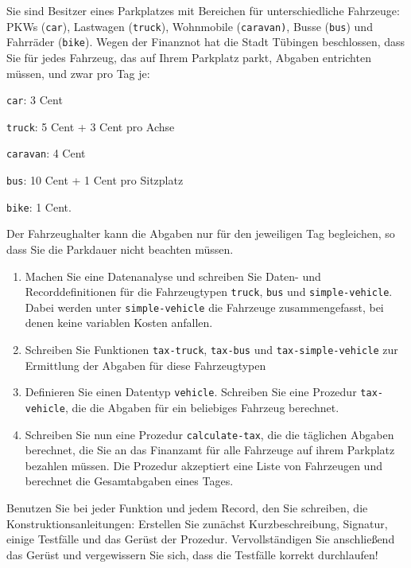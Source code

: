 \begin{aufgabe}
   Sie sind Besitzer eines Parkplatzes mit
  Bereichen für unterschiedliche Fahrzeuge:  PKWs (\texttt{car}), Lastwagen
  (\texttt{truck}), Wohnmobile (\texttt{caravan)}, Busse (\texttt{bus})
  und Fahrräder (\texttt{bike}). 
  Wegen der Finanznot hat die Stadt Tübingen beschlossen, dass 
  Sie für jedes Fahrzeug, das auf Ihrem Parkplatz
  parkt, Abgaben entrichten müssen, und zwar pro Tag je:
  \begin{list}{-}{}
  \item \texttt{car}: 3 Cent
  \item \texttt{truck}: 5 Cent + 3 Cent pro Achse
  \item \texttt{caravan}: 4 Cent
  \item \texttt{bus}: 10 Cent + 1 Cent pro Sitzplatz
  \item \texttt{bike}: 1 Cent.
  \end{list} 
  Der Fahrzeughalter kann die Abgaben nur für den jeweiligen Tag begleichen, 
  so dass Sie die Parkdauer nicht beachten müssen.

  \begin{enumerate}
  \item Machen Sie eine Datenanalyse und schreiben Sie Daten- und 
    Recorddefinitionen für die Fahrzeugtypen \texttt{truck}, \texttt{bus} und
    \texttt{simple-vehicle}. Dabei werden unter \texttt{simple-vehicle} die
    Fahrzeuge zusammengefasst, bei denen keine variablen Kosten anfallen.
  \item Schreiben Sie  Funktionen
    \texttt{tax-truck}, \texttt{tax-bus} und \texttt{tax-simple-vehicle}
    zur Ermittlung der Abgaben für diese Fahrzeugtypen
  \item Definieren Sie einen Datentyp \texttt{vehicle}. Schreiben Sie eine
    Prozedur \texttt{tax-vehicle}, die die Abgaben für ein beliebiges Fahrzeug 
    berechnet.    
  \item Schreiben Sie nun eine Prozedur \texttt{calculate-tax}, die die täglichen 
    Abgaben berechnet, die Sie an das Finanzamt für alle Fahrzeuge auf ihrem Parkplatz
    bezahlen müssen. Die Prozedur akzeptiert eine Liste von Fahrzeugen und
    berechnet die Gesamtabgaben eines Tages.
  \end{enumerate}
  Benutzen Sie bei jeder Funktion und jedem Record, den Sie schreiben,
  die Konstruktionsanleitungen: Erstellen Sie zunächst
  Kurzbeschreibung, Signatur, einige Testfälle und das Gerüst der Prozedur.
  Vervollständigen Sie anschließend das Gerüst und vergewissern Sie sich,
  dass die Testfälle korrekt durchlaufen!
\end{aufgabe}

